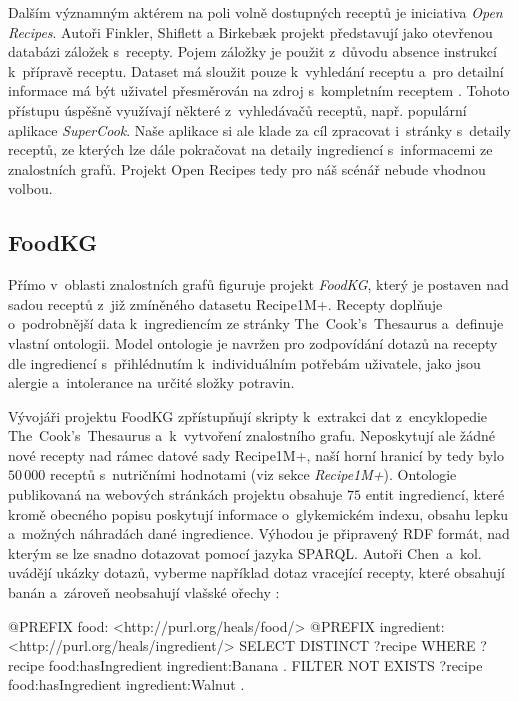 Dalším významným aktérem na poli volně dostupných receptů je iniciativa \emph{Open Recipes}. Autoři Finkler, Shiflett a Birkebæk projekt představují jako otevřenou databázi záložek s~recepty. Pojem záložky je použit z~důvodu absence instrukcí k~přípravě receptu. Dataset má sloužit pouze k~vyhledání receptu a~pro detailní informace má být uživatel přesměrován na zdroj s~kompletním receptem \citep{open-recipes}. Tohoto přístupu úspěšně využívají některé z~vyhledávačů receptů, např. populární aplikace \emph{SuperCook}. Naše aplikace si ale klade za cíl zpracovat i~stránky s~detaily receptů, ze kterých lze dále pokračovat na detaily ingrediencí s~informacemi ze znalostních grafů. Projekt Open Recipes tedy pro náš scénář nebude vhodnou volbou.

\subsection{FoodKG}

Přímo v~oblasti znalostních grafů figuruje projekt \emph{FoodKG}, který je postaven nad sadou receptů z~již zmíněného datasetu Recipe1M+. Recepty doplňuje o~podrobnější data k~ingrediencím ze stránky The~Cook's~Thesaurus a~definuje vlastní ontologii. Model ontologie je navržen pro zodpovídání dotazů na recepty dle ingrediencí s~přihlédnutím k~individuálním potřebám uživatele, jako jsou alergie a~intolerance na určité složky potravin.

Vývojáři projektu FoodKG zpřístupňují skripty k~extrakci dat z~encyklopedie The~Cook's~Thesaurus a~k~vytvoření znalostního grafu. Neposkytují ale žádné nové recepty nad rámec datové sady Recipe1M+, naší horní hranicí by tedy bylo $50\,000$ receptů s~nutričními hodnotami (viz sekce \emph{Recipe1M+}). Ontologie publikovaná na webových stránkách projektu obsahuje $75$ entit ingrediencí, které kromě obecného popisu poskytují informace o~glykemickém indexu, obsahu lepku a~možných náhradách dané ingredience. Výhodou je připravený RDF formát, nad kterým se lze snadno dotazovat pomocí jazyka SPARQL. Autoři Chen~a~kol. uvádějí ukázky dotazů, vyberme například dotaz vracející recepty, které obsahují banán a~zároveň neobsahují vlašské ořechy \citep{food-kg}:

\begin{code}
@PREFIX food: <http://purl.org/heals/food/>
@PREFIX ingredient: <http://purl.org/heals/ingredient/>
SELECT DISTINCT ?recipe
WHERE {
    ?recipe food:hasIngredient ingredient:Banana .
    FILTER NOT EXISTS {
        ?recipe food:hasIngredient ingredient:Walnut .
    }
}
\end{code}


